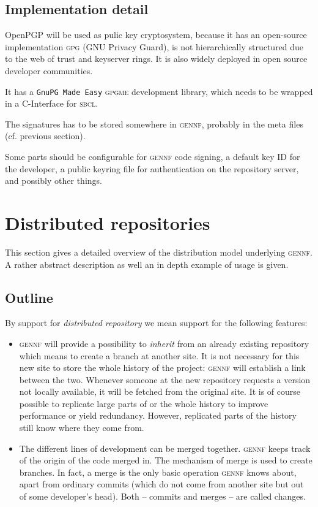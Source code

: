 \documentclass[fleqn, 10pt, a4paper]{report} \usepackage{amssymb}
\newcommand{\GENNF}{\textsc{gennf}}
\begin{document}
\subsection{Implementation detail}

OpenPGP will be used as pulic key cryptosystem, because it has an
open-source implementation \textsc{gpg} (GNU Privacy Guard), is not
hierarchically structured due to the web of trust and keyserver rings.
It is also widely deployed in open source developer communities.

It has a \texttt{GnuPG Made Easy} \textsc{gpgme} development library,
which needs to be wrapped in a C-Interface for \textsc{sbcl}.

The signatures has to be stored somewhere in \textsc{gennf},
probably in the meta files (cf. previous section).

Some parts should be configurable for \textsc{gennf} code signing, a
default key ID for the developer, a public keyring file for
authentication on the repository server, and possibly other things.


\section{Distributed repositories \label{distrib}}

This section gives a detailed overview of the distribution model
underlying \GENNF{}. A rather abstract description as well an in depth
example of usage is given.


\subsection{Outline}

By support for \emph{distributed repository} we mean support for the
following features:

\begin{itemize}
\item \textsc{gennf} will provide a possibility to \emph{inherit} from
  an already existing repository which means to create a branch at
  another site. It is not necessary for this new site to store the
  whole history of the project: \textsc{gennf} will establish a link
  between the two. Whenever someone at the new repository requests a
  version not locally available, it will be fetched from the original
  site. It is of course possible to replicate large parts of or the
  whole history to improve performance or yield redundancy. However,
  replicated parts of the history still know where they come from.

\item The different lines of development can be merged together.
  \textsc{gennf} keeps track of the origin of the code merged in. The
  mechanism of merge is used to create branches. In fact, a merge is
  the only basic operation \textsc{gennf} knows about, apart from
  ordinary commits (which do not come from another site but out of
  some developer's head). Both -- commits and merges -- are called
  changes.
\end{itemize}
\end{document}
